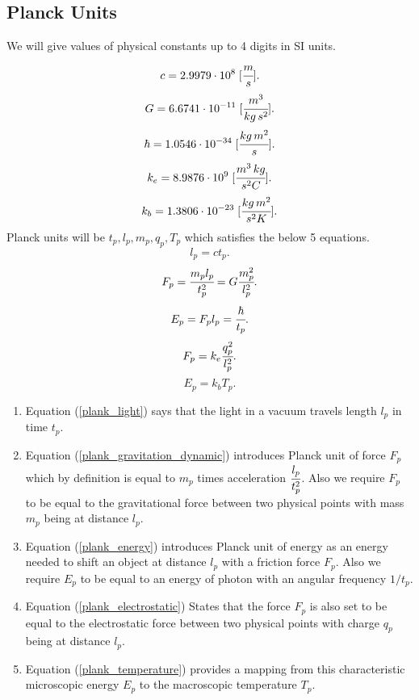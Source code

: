 \documentclass[main.tex]{subfiles}
\begin{document}
\subsection{Planck Units}
We will give values of physical constants up to 4 digits in SI units.
\begin{equation}
    c = 2.9979 \cdot 10^8\; [\cfrac{m}{s}].
\end{equation}
\begin{equation}
    G = 6.6741 \cdot 10^{-11}\; [\cfrac{m^3}{kg\,s^2}].
\end{equation}
\begin{equation}
    \hbar = 1.0546 \cdot 10^{-34}\; [\cfrac{kg\, m^2}{s}].
\end{equation}
\begin{equation}
    k_e = 8.9876 \cdot 10^9\; [\cfrac{m^3\, kg}{s^2 C}].
\end{equation}
\begin{equation}
    k_b = 1.3806 \cdot 10^{-23}\; [\cfrac{kg\,m^2}{s^2 K}].
\end{equation}
Planck units will be $t_p, l_p, m_p, q_p, T_p$ which satisfies the below 5 equations.
\begin{equation}
\label{plank_light}
    l_p = c t_p.
\end{equation}
\begin{equation}
\label{plank_gravitation_dynamic}
    F_p = \cfrac{m_pl_p}{t^2_p} = G\cfrac{m_p^2}{l_p^2}.
\end{equation}
\begin{equation}
\label{plank_energy}
    E_p = F_p l_p = \cfrac{\hbar}{t_p}.
\end{equation}
\begin{equation}
\label{plank_electrostatic}
    F_p = k_e \cfrac{q_p^2}{l_p^2}.
\end{equation}
\begin{equation}
\label{plank_temperature}
    E_p = k_b T_p.
\end{equation}
\begin{enumerate}
    \item Equation (\ref{plank_light}) says that the light in a vacuum travels length $l_p$ in time $t_p$.
    \item Equation (\ref{plank_gravitation_dynamic}) introduces Planck unit of force $F_p$ which by definition is equal to $m_p$ times acceleration $\cfrac{l_p}{t^2_p}$. Also we require $F_p$ to be equal to the gravitational force between two physical points with mass $m_p$ being at distance $l_p$.
    \item Equation (\ref{plank_energy}) introduces Planck unit of energy as an energy needed to shift an object at distance $l_p$ with a friction force $F_p$. Also we require $E_p$ to be equal to an energy of photon with an angular frequency $1/t_p$.
    \item Equation (\ref{plank_electrostatic}) States that the force $F_p$ is also set to be equal to the electrostatic force between two physical points with charge $q_p$ being at distance $l_p$.
    \item Equation (\ref{plank_temperature}) provides a mapping from this characteristic microscopic energy $E_p$ to the macroscopic temperature $T_p$.
\end{enumerate}
\end{document}
